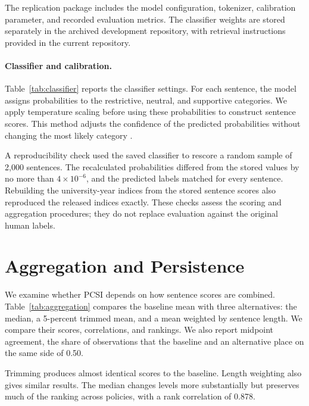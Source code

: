\documentclass[11pt]{article}
\begin{document}
The replication package includes the model configuration, tokenizer, calibration parameter, and recorded evaluation metrics. The classifier weights are stored separately in the archived development repository, with retrieval instructions provided in the current repository.

\paragraph{Classifier and calibration.}
Table~\ref{tab:classifier} reports the classifier settings. For each sentence, the model assigns probabilities to the restrictive, neutral, and supportive categories. We apply temperature scaling before using these probabilities to construct sentence scores. This method adjusts the confidence of the predicted probabilities without changing the most likely category \citep{guo2017calibration}.

A reproducibility check used the saved classifier to rescore a random sample of 2,000 sentences. The recalculated probabilities differed from the stored values by no more than $4\times10^{-6}$, and the predicted labels matched for every sentence. Rebuilding the university-year indices from the stored sentence scores also reproduced the released indices exactly. These checks assess the scoring and aggregation procedures; they do not replace evaluation against the original human labels.



\section{Aggregation and Persistence}\label{app:robust}
\setcounter{table}{0}

We examine whether PCSI depends on how sentence scores are combined. Table~\ref{tab:aggregation} compares the baseline mean with three alternatives: the median, a 5-percent trimmed mean, and a mean weighted by sentence length. We compare their scores, correlations, and rankings. We also report midpoint agreement, the share of observations that the baseline and an alternative place on the same side of 0.50.

Trimming produces almost identical scores to the baseline. Length weighting also gives similar results. The median changes levels more substantially but preserves much of the ranking across policies, with a rank correlation of 0.878.


\end{document}
